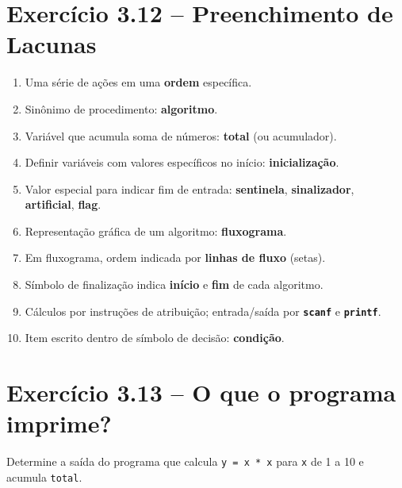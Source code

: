 \documentclass[12pt,a4paper]{article}
\begin{document}
\section{Exercício 3.12 -- Preenchimento de Lacunas}

\begin{respostabox}
\begin{enumerate}[label=\textbf{\alph*)}]
\item Uma série de ações em uma \textbf{ordem} específica.
\item Sinônimo de procedimento: \textbf{algoritmo}.
\item Variável que acumula soma de números: \textbf{total} (ou acumulador).
\item Definir variáveis com valores específicos no início: \textbf{inicialização}.
\item Valor especial para indicar fim de entrada: \textbf{sentinela}, \textbf{sinalizador}, \textbf{artificial}, \textbf{flag}.
\item Representação gráfica de um algoritmo: \textbf{fluxograma}.
\item Em fluxograma, ordem indicada por \textbf{linhas de fluxo} (setas).
\item Símbolo de finalização indica \textbf{início} e \textbf{fim} de cada algoritmo.
\item Cálculos por instruções de atribuição; entrada/saída por \textbf{\texttt{scanf}} e \textbf{\texttt{printf}}.
\item Item escrito dentro de símbolo de decisão: \textbf{condição}.
\end{enumerate}
\end{respostabox}

\section{Exercício 3.13 -- O que o programa imprime?}

\begin{enunciadoBox}[Enunciado 3.13]
Determine a saída do programa que calcula \texttt{y = x * x} para \texttt{x} de 1 a 10
e acumula \texttt{total}.
\end{enunciadoBox}
\end{document}
